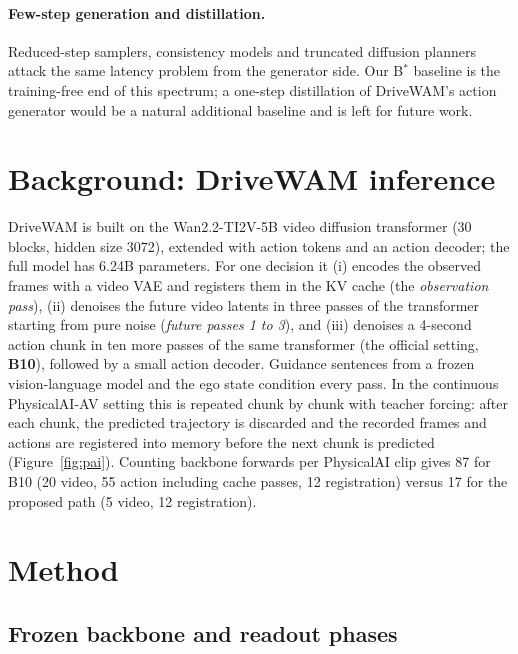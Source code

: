 \documentclass[10pt]{article}
\newcommand{\Bstar}{B$^{*}$}
\begin{document}
\paragraph{Few-step generation and distillation.} Reduced-step samplers, consistency models \citep{song2023consistency} and truncated diffusion planners \citep{liao2025diffusiondrive} attack the same latency problem from the generator side. Our \Bstar{} baseline is the training-free end of this spectrum; a one-step distillation of DriveWAM's action generator would be a natural additional baseline and is left for future work.

\section{Background: DriveWAM inference}
\label{sec:background}

DriveWAM is built on the Wan2.2-TI2V-5B video diffusion transformer (30 blocks, hidden size 3072), extended with action tokens and an action decoder; the full model has 6.24B parameters. For one decision it (i) encodes the observed frames with a video VAE and registers them in the KV cache (the \emph{observation pass}), (ii) denoises the future video latents in three passes of the transformer starting from pure noise (\emph{future passes 1 to 3}), and (iii) denoises a 4-second action chunk in ten more passes of the same transformer (the official setting, \textbf{B10}), followed by a small action decoder. Guidance sentences from a frozen vision-language model and the ego state condition every pass. In the continuous PhysicalAI-AV setting this is repeated chunk by chunk with teacher forcing: after each chunk, the predicted trajectory is discarded and the recorded frames and actions are registered into memory before the next chunk is predicted (Figure~\ref{fig:pai}). Counting backbone forwards per PhysicalAI clip gives 87 for B10 (20 video, 55 action including cache passes, 12 registration) versus 17 for the proposed path (5 video, 12 registration).

\section{Method}
\label{sec:method}

\subsection{Frozen backbone and readout phases}
\label{sec:phases}
\end{document}
